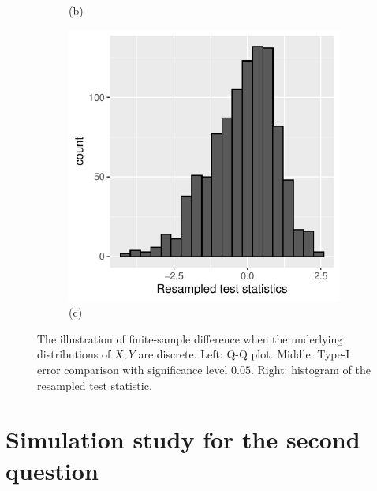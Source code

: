 \documentclass{article}
\begin{document}
\begin{figure}
\begin{subfigure}[h]{0.3\textwidth}
        \small{(b)}
    \end{subfigure}
    \begin{subfigure}[h]{0.3\textwidth}  
        \centering
        \includegraphics[width=\textwidth]{Figures/Q1/resampled-test-stats.pdf} \\ 
        \small{(c)}
    \end{subfigure}
    \caption{\small{The illustration of finite-sample difference when the underlying distributions of $X,Y$ are discrete.
    Left: Q-Q plot. Middle: Type-I error comparison with significance level $0.05$. Right: histogram of the resampled test 
    statistic.} }
    \label{fig:dCRT_GCM_binomial_poisson} 
\end{figure}


\section{Simulation study for the second question}
\end{document}

